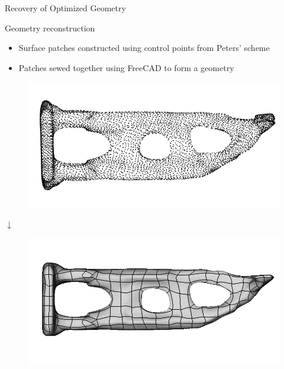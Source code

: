 \begin{frame}{Recovery of Optimized Geometry}
	\begin{minipage}[t]{0.5\linewidth}
		\begin{block}{Geometry reconstruction}
			\begin{itemize}
				\item Surface patches constructed using control points from Peters' scheme \\
				\item Patches sewed together using FreeCAD to form a geometry \\
			\end{itemize}
		\end{block}
	\end{minipage}
	\hfill%
	\begin{minipage}[t]{0.45\linewidth}
		\vspace{-0.25cm}
		\begin{figure}
			\includegraphics[width=.88\textwidth]{Pictures/SecondHalf/Back2CAD1}
		\end{figure}
		\vspace{-0.75cm}
		\begin{center}
			$\downarrow$
		\end{center}
		\vspace{-0.6cm}
		\begin{figure}
			\includegraphics[width=.88\textwidth]{Pictures/SecondHalf/Back2CAD2}
		\end{figure}
		\vspace{-0.75cm}
	\end{minipage}
	\pause
	

\end{frame}
